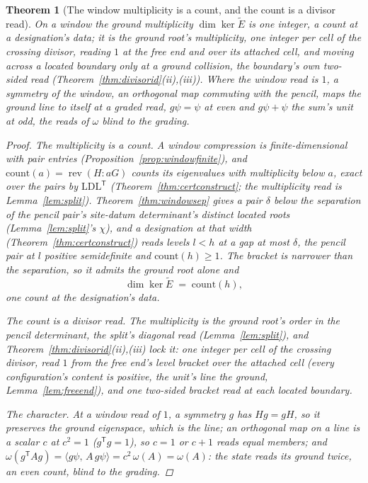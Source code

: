 \documentclass[11pt]{article}
\newtheorem{theorem}{Theorem}
\theoremstyle{definition}
\begin{document}
\begin{theorem}[The window multiplicity is a count, and the count is a
divisor read]\label{thm:SO}
On a window the ground multiplicity $\dim\ker\tilde E$ is one
integer, a count at a designation's data; it is the ground
root's multiplicity, one integer per cell of the crossing divisor,
reading $1$ at the free end and over its attached cell, and
moving across a located boundary only at a ground collision, the
boundary's own two-sided read
(Theorem~\ref{thm:divisorid}(ii),(iii)). Where the window read is $1$, a
symmetry of the window, an orthogonal map commuting with the pencil,
maps the ground line to itself at a graded read, $g\psi=\psi$ at
even and $g\psi+\psi$ the sum's unit at odd, the reads of $\omega$
blind to the grading.
\begin{proof}
\emph{The multiplicity is a count.}
A window compression is finite-dimensional with pair entries
(Proposition~\ref{prop:windowfinite}), and
$\mathrm{count}(a)=\operatorname{rev}(H\!:\!aG)$ counts its eigenvalues with
multiplicity below $a$, exact over the pairs by $\mathrm{LDL}^{\mathsf T}$
(Theorem~\ref{thm:certconstruct}; the multiplicity read is
Lemma~\ref{lem:split}). Theorem~\ref{thm:windowsep} gives a pair
$\delta$ below the separation of the pencil pair's site-datum
determinant's distinct located roots (Lemma~\ref{lem:split}'s $\chi$),
and a designation at that width (Theorem~\ref{thm:certconstruct})
reads levels $l<h$ at a gap at most $\delta$,
the pencil pair at $l$ positive semidefinite and
$\mathrm{count}(h)\ge1$. The bracket is narrower than the separation, so it
admits the ground root alone and
\[
\dim\ker\tilde E\;=\;\mathrm{count}(h) ,
\]
one count at the designation's data.

\emph{The count is a divisor read.} The multiplicity is the ground
root's order in the pencil determinant, the split's diagonal read
(Lemma~\ref{lem:split}), and
Theorem~\ref{thm:divisorid}(ii),(iii) lock it: one integer per cell of
the crossing divisor, read $1$ from the free end's level bracket over
the attached cell (every configuration's content is positive, the
unit's line the ground, Lemma~\ref{lem:freeend}), and one two-sided bracket read at
each located boundary.

\emph{The character.} At a window read of $1$, a symmetry $g$ has
$Hg=gH$, so it preserves the ground eigenspace, which is the line; an
orthogonal map on a line is a scalar $c$ at $c^2=1$
($g^{\mathsf T}g=1$), so $c=1$ or $c+1$ reads equal members; and
$\omega(g^{\mathsf T}Ag)=\langle g\psi,\,A\,g\psi\rangle
=c^2\,\omega(A)=\omega(A)$: the state reads its ground twice, an even
count, blind to the grading.
\end{proof}
\end{theorem}
\end{document}
